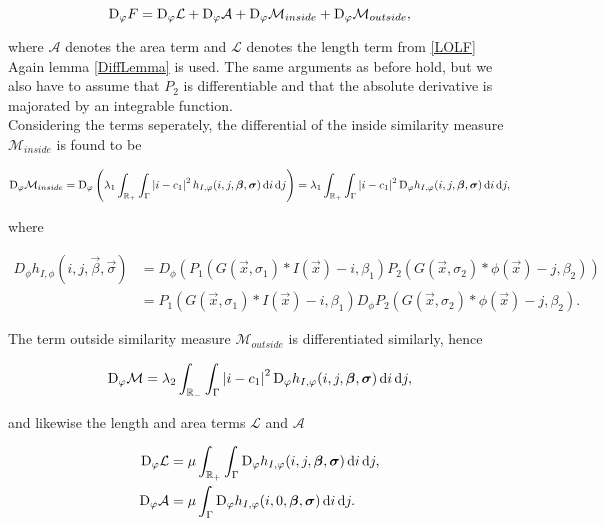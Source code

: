 \begin{equation}
  {\rm D}_\varphi F = {\rm D}_\varphi \mathcal{L} + {\rm D}_\varphi \mathcal{A} + {\rm D}_\varphi\mathcal{M}_{inside} + {\rm D}_\varphi \mathcal{M}_{outside},
\end{equation}

where $\mathcal{A}$ denotes the area term and $\mathcal{L}$ denotes the length term from \eqref{LOLF}\\

Again lemma \ref{DiffLemma} is used. The same arguments as before hold, but we also have to assume that $P_2$ is differentiable and that the absolute derivative is majorated by an integrable function.\\
Considering the terms seperately, the differential of the inside similarity measure $\mathcal{M}_{inside}$ is found to be

\begin{equation}
{\rm D}_\varphi \mathcal{M}_{inside} = {\rm D}_\varphi \left( \lambda_1\int_{\mathbb R_+} \int_{\Gamma} \left| {i-c_1} \right|^2h_{I,\varphi}(i,j,\boldsymbol{\beta} ,\boldsymbol{\sigma} )\,{\rm d} i\,{\rm d} j\right) = \lambda_1\int_{\mathbb R_+} \int_{\Gamma} \left| {i-c_1} \right|^2 {\rm D}_\varphi h_{I,\varphi}(i,j,\boldsymbol{\beta} ,\boldsymbol{\sigma} )\,{\rm d} i\,{\rm d} j,
\end{equation}

where

\begin{equation}
  \begin{split}
    D_\phi h_{I,\phi}(i,j,\vec{\beta},\vec{\sigma}) &= D_\phi \left(P_1(G(\vec{x},\sigma_1)*I(\vec{x})-i,\beta_1)P_2(G(\vec{x},\sigma_2)*\phi(\vec{x})-j,\beta_2)\right)\\ 
    &= P_1(G(\vec{x},\sigma_1)*I(\vec{x})-i,\beta_1)D_\phi P_2(G(\vec{x},\sigma_2)*\phi(\vec{x})-j,\beta_2).
  \end{split}
\end{equation}

The term outside similarity measure $\mathcal{M}_{outside}$ is differentiated similarly, hence

\begin{equation}
{\rm D}_\varphi \mathcal{M} = \lambda_2\int_{\mathbb R_-} \int_{\Gamma} \left| {i-c_1} \right|^2 {\rm D}_\varphi h_{I,\varphi}(i,j,\boldsymbol{\beta} ,\boldsymbol{\sigma} )\,{\rm d} i\,{\rm d} j,
\end{equation}

and likewise the length and area terms $\mathcal{L}$ and $\mathcal{A}$

\begin{align}
  {\rm D}_\varphi \mathcal{L} &= \mu \int_{\mathbb R_+} \int_{\Gamma} {\rm D}_\varphi h_{I,\varphi}(i,j,\boldsymbol{\beta} ,\boldsymbol{\sigma} )\,{\rm d} i\,{\rm d} j,\\
  {\rm D}_\varphi \mathcal{A} &= \mu  \int_{\Gamma} {\rm D}_\varphi h_{I,\varphi}(i,0,\boldsymbol{\beta} ,\boldsymbol{\sigma} )\,{\rm d} i\,{\rm d} j.
\end{align}

